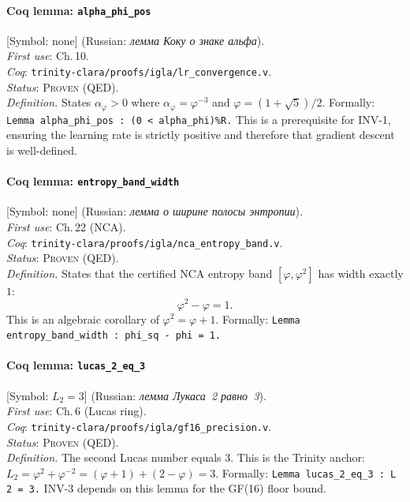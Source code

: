\paragraph*{\textmd{\textbf{Coq lemma: \texttt{alpha\_phi\_pos}}}}
\label{entry:coq-alpha-phi-pos}
[Symbol: none] (Russian: \textit{лемма Коку о знаке альфа}).\\
\textit{First use}: Ch.\,10.\\
\textit{Coq}: \texttt{trinity-clara/proofs/igla/lr\_convergence.v}.\\
\textit{Status}: \textsc{Proven} (QED).\\
\textit{Definition.}
States $\alpha_\varphi > 0$ where $\alpha_\varphi = \varphi^{-3}$ and
$\varphi = (1+\sqrt{5})/2$.
Formally: \texttt{Lemma alpha\_phi\_pos : (0 < alpha\_phi)\%R.}
This is a prerequisite for INV-1, ensuring the learning rate is
strictly positive and therefore that gradient descent is well-defined.

\paragraph*{\textmd{\textbf{Coq lemma: \texttt{entropy\_band\_width}}}}
\label{entry:coq-entropy-band}
[Symbol: none] (Russian: \textit{лемма о ширине полосы энтропии}).\\
\textit{First use}: Ch.\,22 (NCA).\\
\textit{Coq}: \texttt{trinity-clara/proofs/igla/nca\_entropy\_band.v}.\\
\textit{Status}: \textsc{Proven} (QED).\\
\textit{Definition.}
States that the certified NCA entropy band $[\varphi, \varphi^2]$
has width exactly $1$:
\[
\varphi^2 - \varphi = 1.
\]
This is an algebraic corollary of $\varphi^2 = \varphi + 1$.
Formally: \texttt{Lemma entropy\_band\_width : phi\_sq - phi = 1.}

\paragraph*{\textmd{\textbf{Coq lemma: \texttt{lucas\_2\_eq\_3}}}}
\label{entry:coq-lucas2}
[Symbol: $L_2 = 3$] (Russian: \textit{лемма Лукаса~2 равно~3}).\\
\textit{First use}: Ch.\,6 (Lucas ring).\\
\textit{Coq}: \texttt{trinity-clara/proofs/igla/gf16\_precision.v}.\\
\textit{Status}: \textsc{Proven} (QED).\\
\textit{Definition.}
The second Lucas number equals 3.
This is the Trinity anchor:
$L_2 = \varphi^2 + \varphi^{-2} = (\varphi+1)+(2-\varphi)=3$.
Formally: \texttt{Lemma lucas\_2\_eq\_3 : L 2 = 3.}
INV-3 depends on this lemma for the GF(16) floor bound.

